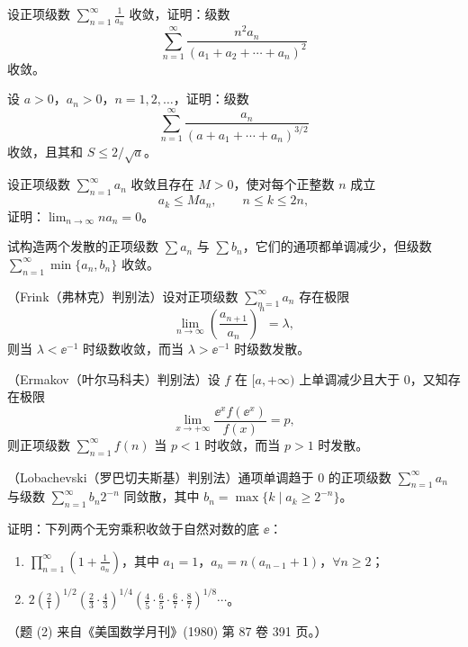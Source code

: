 \begin{xreferenceproblem}[1]
设正项级数 $\sum_{n=1}^{\infty}\frac1{a_n}$ 收敛，证明：级数
\[
\sum_{n=1}^{\infty}\frac{n^2a_n}{(a_1+a_2+\cdots+a_n)^2}
\]
收敛。
\end{xreferenceproblem}

\begin{xreferenceproblem}[2]
设 $a>0$，$a_n>0$，$n=1,2,\ldots$，证明：级数
\[
\sum_{n=1}^{\infty}\frac{a_n}{(a+a_1+\cdots+a_n)^{3/2}}
\]
收敛，且其和 $S\leq2/\sqrt a$。
\end{xreferenceproblem}

\begin{xreferenceproblem}[3]
设正项级数 $\sum_{n=1}^{\infty}a_n$ 收敛且存在 $M>0$，使对每个正整数 $n$ 成立
\[
a_k\leq Ma_n,\qquad n\leq k\leq2n,
\]
证明：$\lim_{n\to\infty}na_n=0$。
\end{xreferenceproblem}

\begin{xreferenceproblem}[4]
试构造两个发散的正项级数 $\sum a_n$ 与 $\sum b_n$，它们的通项都单调减少，但级数 $\sum_{n=1}^{\infty}\min\{a_n,b_n\}$ 收敛。
\end{xreferenceproblem}

\begin{xreferenceproblem}[5]
（Frink（弗林克）判别法）设对正项级数 $\sum_{n=1}^{\infty}a_n$ 存在极限
\[
\lim_{n\to\infty}\left(\frac{a_{n+1}}{a_n}\right)^n=\lambda,
\]
则当 $\lambda<\ee^{-1}$ 时级数收敛，而当 $\lambda>\ee^{-1}$ 时级数发散。
\end{xreferenceproblem}

\begin{xreferenceproblem}[6]
（Ermakov（叶尔马科夫）判别法）设 $f$ 在 $[a,+\infty)$ 上单调减少且大于 0，又知存在极限
\[
\lim_{x\to+\infty}\frac{\ee^xf(\ee^x)}{f(x)}=p,
\]
则正项级数 $\sum_{n=1}^{\infty}f(n)$ 当 $p<1$ 时收敛，而当 $p>1$ 时发散。
\end{xreferenceproblem}

\begin{xreferenceproblem}[7]
（Lobachevski（罗巴切夫斯基）判别法）通项单调趋于 0 的正项级数 $\sum_{n=1}^{\infty}a_n$ 与级数 $\sum_{n=1}^{\infty}b_n2^{-n}$ 同敛散，其中 $b_n=\max\{k\mid a_k\geq2^{-n}\}$。
\end{xreferenceproblem}

\begin{xreferenceproblem}[8]
证明：下列两个无穷乘积收敛于自然对数的底 $\ee$：
\begin{enumerate}[label=(\arabic*)]
\item $\displaystyle\prod_{n=1}^{\infty}\left(1+\frac1{a_n}\right)$，其中 $a_1=1$，$a_n=n(a_{n-1}+1)$，$\forall n\geq2$；
\item $\displaystyle 2\left(\frac21\right)^{1/2}\left(\frac23\cdot\frac43\right)^{1/4}\left(\frac45\cdot\frac65\cdot\frac67\cdot\frac87\right)^{1/8}\cdots$。
\end{enumerate}
（题 (2) 来自《美国数学月刊》(1980) 第 87 卷 391 页。）
\end{xreferenceproblem}

